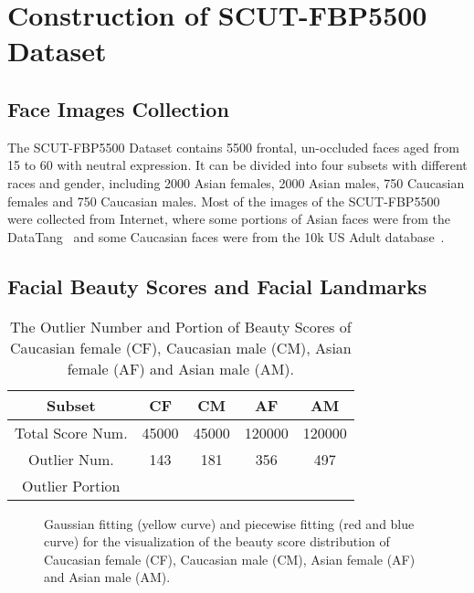 \documentclass[10pt,conference,a4paper]{IEEEtran}
\begin{document}
\section{Construction of SCUT-FBP5500 Dataset}
\subsection{Face Images Collection}
The SCUT-FBP5500 Dataset contains 5500 frontal, un-occluded faces aged from 15 to 60 with neutral expression. It can be divided into four subsets with different races and gender, including 2000 Asian females, 2000 Asian males, 750 Caucasian females and 750 Caucasian males. Most of the images of the SCUT-FBP5500 were collected from Internet, where some portions of Asian faces were from the DataTang~\cite{datatang} and some Caucasian faces were from the 10k US Adult database~\cite{10kUS}.


\subsection{Facial Beauty Scores and Facial Landmarks}

\begin{table}[!t]
\centering
\caption{The Outlier Number and Portion of Beauty Scores of Caucasian female (CF), Caucasian male (CM), Asian female (AF) and Asian male (AM).}
\label{tab_filer}
\begin{tabular}{|c||c|c|c|c|}
\hline
Subset & CF & CM & AF & AM \\
\hline
\hline
Total Score Num. & 45000 & 45000 & 120000 & 120000 \\
\hline
Outlier Num. & 143 & 181 & 356 & 497 \\
\hline
Outlier Portion &  &  &  &\\
\hline
\end{tabular}
\end{table}

\begin{figure}[!t]
\centering
{}

\caption{Gaussian fitting (yellow curve) and piecewise fitting (red and blue curve) for the visualization of the beauty score distribution of Caucasian female (CF), Caucasian male (CM), Asian female (AF) and Asian male (AM).}
\label{fig_fitting_7}
\end{figure}
\end{document}
